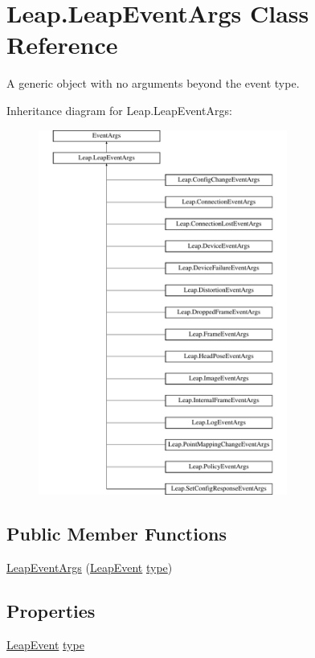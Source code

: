 \hypertarget{class_leap_1_1_leap_event_args}{}\section{Leap.\+Leap\+Event\+Args Class Reference}
\label{class_leap_1_1_leap_event_args}


A generic object with no arguments beyond the event type.  


Inheritance diagram for Leap.\+Leap\+Event\+Args\+:\begin{figure}[H]
\begin{center}
\leavevmode
\includegraphics[height=12.000000cm]{class_leap_1_1_leap_event_args}
\end{center}
\end{figure}
\subsection*{Public Member Functions}
\begin{DoxyCompactItemize}
\item 
\mbox{\hyperlink{class_leap_1_1_leap_event_args_afaa160ab8d03a4288bcb5355eadefade}{Leap\+Event\+Args}} (\mbox{\hyperlink{namespace_leap_a5b8c8df3b9ace307e29863779a4ae85d}{Leap\+Event}} \mbox{\hyperlink{class_leap_1_1_leap_event_args_ad6b72c7eb6588be538cd1f149ffcc355}{type}})
\end{DoxyCompactItemize}
\subsection*{Properties}
\begin{DoxyCompactItemize}
\item 
\mbox{\hyperlink{namespace_leap_a5b8c8df3b9ace307e29863779a4ae85d}{Leap\+Event}} \mbox{\hyperlink{class_leap_1_1_leap_event_args_ad6b72c7eb6588be538cd1f149ffcc355}{type}}
\end{DoxyCompactItemize}


